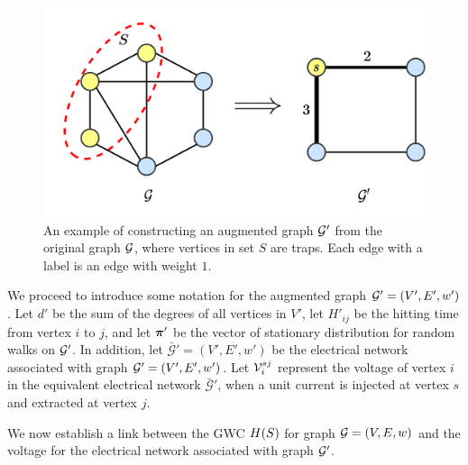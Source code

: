 \documentclass[10pt,twocolumn,twoside]{IEEEtran}
\begin{document}
    \begin{figure}[!t]
        \centering
        \includegraphics[width=0.9\linewidth]{augmented_graph.png}
        \caption{An example of constructing an augmented graph \(\mathcal{G}'\) from the original graph \(\mathcal{G}\), where  vertices in set $S$ are traps. Each edge with a label is an edge with  weight \(1\).}
        \label{fig:augmented-graph}
    \end{figure}

    We proceed to introduce some notation for the augmented graph \(\mathcal{G}'=\left( V',E',w' \right)\). Let \(d'\) be the sum of the degrees of all vertices in $V'$, let $H'_{ij}$ be the hitting time from vertex $i$ to $j$, and let \(\boldsymbol{\pi}'\) be the vector of stationary distribution for random walks on  \(\mathcal{G}'\). In addition, let $\mathcal{\bar{G}}'=(V',E',w')$ be the electrical network associated with graph \(\mathcal{G}'=\left( V',E',w' \right)\). Let \(\mathcal{V}_i^{sj}\) represent the voltage of vertex \(i\) in the equivalent electrical network $\mathcal{\bar{G}}'$, when a unit current is injected at vertex \(s\) and extracted at vertex \(j\).

    We now establish a link between the GWC \(H(S)\) for graph  \(\mathcal{G}=\left( V,E,w \right)\) and the voltage for the electrical network associated with graph \(\mathcal{G}'\).
\end{document}
